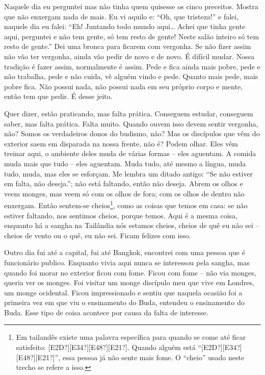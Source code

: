 Naquele dia eu perguntei mas não tinha quem quisesse os cinco
preceitos. Mostra que não enxergam nada de mais. Eu vi aquilo e: “Oh,
que tristeza!” e falei, naquele dia eu falei: “Eh! Juntando todo mundo
aqui… Achei que tinha gente aqui, perguntei e não tem gente, só tem
resto de gente! Neste salão inteiro só tem resto de gente.” Dei uma
bronca para ficarem com vergonha. Se não fizer assim não vão ter
vergonha, ainda vão pedir de novo e de novo. É difícil mudar. Nossa
tradição é fazer assim, normalmente é assim. Pede e fica ainda mais
pobre, pede e não trabalha, pede e não cuida, vê alguém vindo e pede.
Quanto mais pede, mais pobre fica. Não possui nada, não possui nada em
seu próprio corpo e mente, então tem que pedir. É desse jeito.

Quer dizer, estão praticando, mas falta prática. Conseguem estudar,
conseguem saber, mas falta prática. Falta muito. Quando ouvem isso
devem sentir vergonha, não? Somos os verdadeiros donos do budismo, não?
Mas os discípulos que vêm do exterior saem em disparada na nossa
frente, não é? Podem olhar. Eles vêm treinar aqui, o ambiente deles
muda de várias formas – eles aguentam. A comida muda
mais que tudo – eles aguentam. Muda tudo, até mesmo
a língua, muda tudo, muda, mas eles se esforçam. Me lembra um ditado
antigo: “Se não estiver em falta, não deseja.”; não está faltando,
então não deseja. Abrem os olhos e veem monges, mas veem só com os
olhos de fora; com os olhos de dentro não enxergam. Então sentem-se
cheios\footnote{Em tailandês existe uma palavra específica para quando
se come até ficar satisfeito: [E2D?][E34?][E48?][E21?]. Quando alguém
está “[E2D?][E34?][E48?][E21?]”, essa pessoa já não sente mais fome. O
“cheio” usado neste trecho se refere a isso.}, como as coisas que temos
em casa: se não estiver faltando, nos sentimos cheios, porque temos.
Aqui é a mesma coisa, enquanto há a sangha na Tailândia nós estamos
cheios, cheios de quê eu não sei – cheios de vento
ou o quê, eu não sei. Ficam felizes com isso. 

Outro dia fui até a capital, fui até Bangkok, encontrei com uma
pessoa que é funcionário publico. Enquanto vivia aqui nunca se
interessou pela sangha, mas quando foi morar no exterior ficou com
fome. Ficou com fome – não via monges, queria ver os
monges. Foi visitar um monge discípulo meu que vive em Londres, um
monge ocidental. Ficou impressionado e sentiu que naquela ocasião foi a
primeira vez em que viu o ensinamento do Buda, entendeu o ensinamento
do Buda. Esse tipo de coisa acontece por causa da falta de interesse. 

